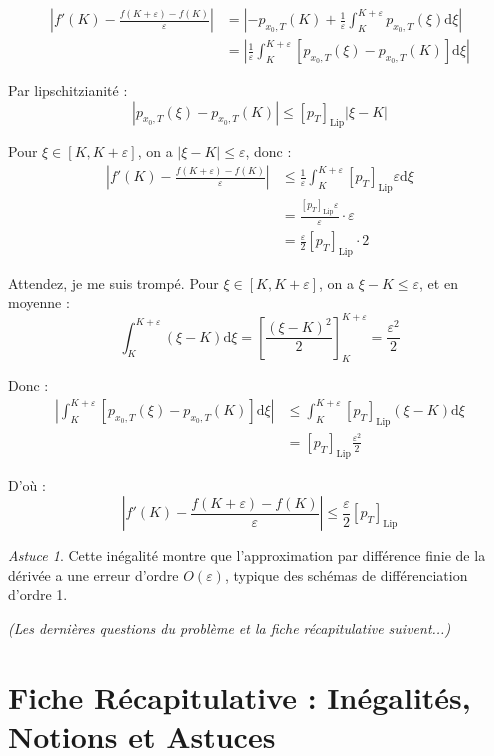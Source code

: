 \documentclass[12pt,a4paper]{article}
\theoremstyle{definition}
\theoremstyle{remark}
\newtheorem*{astuce}{Astuce}
\newcommand{\dd}{\mathrm{d}}
\begin{document}
\begin{align*}
\left|f'(K) - \frac{f(K+\varepsilon) - f(K)}{\varepsilon}\right| &= \left|-p_{x_0,T}(K) + \frac{1}{\varepsilon}\int_K^{K+\varepsilon} p_{x_0,T}(\xi)\dd\xi\right| \\
&= \left|\frac{1}{\varepsilon}\int_K^{K+\varepsilon} [p_{x_0,T}(\xi) - p_{x_0,T}(K)]\dd\xi\right|
\end{align*}

Par lipschitzianité :
\[
|p_{x_0,T}(\xi) - p_{x_0,T}(K)| \leq [p_T]_{\text{Lip}}|\xi - K|
\]

Pour $\xi \in [K, K+\varepsilon]$, on a $|\xi - K| \leq \varepsilon$, donc :
\begin{align*}
\left|f'(K) - \frac{f(K+\varepsilon) - f(K)}{\varepsilon}\right| &\leq \frac{1}{\varepsilon}\int_K^{K+\varepsilon} [p_T]_{\text{Lip}}\varepsilon \dd\xi \\
&= \frac{[p_T]_{\text{Lip}}\varepsilon}{\varepsilon} \cdot \varepsilon \\
&= \frac{\varepsilon}{2}[p_T]_{\text{Lip}} \cdot 2
\end{align*}

Attendez, je me suis trompé. Pour $\xi \in [K, K+\varepsilon]$, on a $\xi - K \leq \varepsilon$, et en moyenne :
\[
\int_K^{K+\varepsilon} (\xi - K)\dd\xi = \left[\frac{(\xi-K)^2}{2}\right]_K^{K+\varepsilon} = \frac{\varepsilon^2}{2}
\]

Donc :
\begin{align*}
\left|\int_K^{K+\varepsilon} [p_{x_0,T}(\xi) - p_{x_0,T}(K)]\dd\xi\right| &\leq \int_K^{K+\varepsilon} [p_T]_{\text{Lip}}(\xi - K)\dd\xi \\
&= [p_T]_{\text{Lip}} \frac{\varepsilon^2}{2}
\end{align*}

D'où :
\[
\boxed{\left|f'(K) - \frac{f(K+\varepsilon) - f(K)}{\varepsilon}\right| \leq \frac{\varepsilon}{2}[p_T]_{\text{Lip}}}
\]

\begin{astuce}
Cette inégalité montre que l'approximation par différence finie de la dérivée a une erreur d'ordre $O(\varepsilon)$, typique des schémas de différenciation d'ordre 1.
\end{astuce}

\textit{(Les dernières questions du problème et la fiche récapitulative suivent...)}

\newpage
\section{Fiche Récapitulative : Inégalités, Notions et Astuces}
\end{document}
